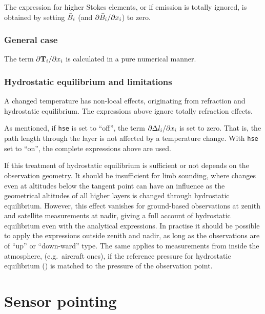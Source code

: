 The expression for higher Stokes elements, or if emission is totally ignored,
is obtained by setting $\bar{B}_i$
(and $\partial\bar{B}_i/\partial x_{i}$) to zero.


\subsubsection{General case}
%
The term $\partial\mathbf{T}_{i}/\partial x_{i}$ is calculated in a pure
numerical manner.



\subsubsection{Hydrostatic equilibrium and limitations}
%
A changed temperature has non-local effects, originating from refraction and
hydrostatic equilibrium. The expressions above ignore totally refraction
effects. 

As  mentioned,  if \verb|hse|  is  set  to  ``off'',  the term  $\partial  \Delta
l_{i}/\partial x_{i}$  is set  to  zero. That  is,  the path  length
through the layer is not affected  by a temperature change. With \verb|hse| set
to ``on'', the complete expressions above are used.

If this treatment of hydrostatic equilibrium is sufficient or not depends on
the observation geometry. It should be insufficient for limb sounding,
where changes even at altitudes below the tangent point can have an influence
as the geometrical altitudes of all higher layers is changed through
hydrostatic equilibrium.  However, this effect vanishes for
ground-based observations at zenith and satellite measurements at nadir, giving
a full account of hydrostatic equilibrium even with the analytical expressions.
In practise it should be possible to apply the expressions outside zenith and
nadir, as long as the observations are of ``up'' or ``down-ward'' type. The
same applies to measurements from inside the atmosphere, (e.g.\ aircraft ones),
if the reference pressure for hydrostatic equilibrium () is
matched to the pressure of the observation point.





\section{Sensor pointing}
\label{sec:wfuns:sensorpointing}

